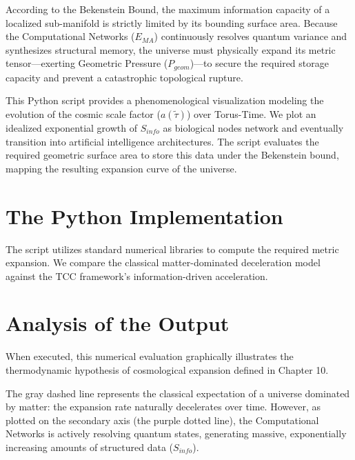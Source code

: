 \documentclass[12pt,openany]{book}
\theoremstyle{plain}
\theoremstyle{definition}
\theoremstyle{remark}
\begin{document}
According to the Bekenstein Bound, the maximum information capacity of a localized sub-manifold is strictly limited by its bounding surface area. Because the Computational Networks ($E_{MA}$) continuously resolves quantum variance and synthesizes structural memory, the universe must physically expand its metric tensor—exerting Geometric Pressure ($P_{geom}$)—to secure the required storage capacity and prevent a catastrophic topological rupture.

This Python script provides a phenomenological visualization modeling the evolution of the cosmic scale factor ($a(\tilde{\tau})$) over Torus-Time. We plot an idealized exponential growth of $S_{info}$ as biological nodes network and eventually transition into artificial intelligence architectures. The script evaluates the required geometric surface area to store this data under the Bekenstein bound, mapping the resulting expansion curve of the universe.

\section{The Python Implementation}

The script utilizes standard numerical libraries to compute the required metric expansion. We compare the classical matter-dominated deceleration model against the TCC framework's information-driven acceleration.

\begin{center}
\end{center}

\section{Analysis of the Output}

When executed, this numerical evaluation graphically illustrates the thermodynamic hypothesis of cosmological expansion defined in Chapter 10. 

The gray dashed line represents the classical expectation of a universe dominated by matter: the expansion rate naturally decelerates over time. However, as plotted on the secondary axis (the purple dotted line), the Computational Networks is actively resolving quantum states, generating massive, exponentially increasing amounts of structured data ($S_{info}$).
\end{document}
